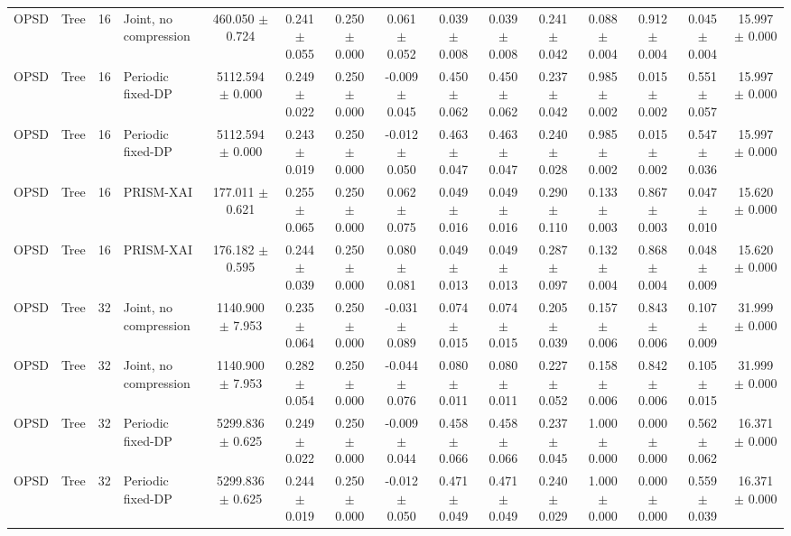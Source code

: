 \begin{table}[t]
\begin{tabular}{llllccccccccccc}
OPSD & Tree & 16 & Joint, no compression & 460.050 $\pm$ 0.724 & 0.241 $\pm$ 0.055 & 0.250 $\pm$ 0.000 & 0.061 $\pm$ 0.052 & 0.039 $\pm$ 0.008 & 0.039 $\pm$ 0.008 & 0.241 $\pm$ 0.042 & 0.088 $\pm$ 0.004 & 0.912 $\pm$ 0.004 & 0.045 $\pm$ 0.004 & 15.997 $\pm$ 0.000 \\
OPSD & Tree & 16 & Periodic fixed-DP & 5112.594 $\pm$ 0.000 & 0.249 $\pm$ 0.022 & 0.250 $\pm$ 0.000 & -0.009 $\pm$ 0.045 & 0.450 $\pm$ 0.062 & 0.450 $\pm$ 0.062 & 0.237 $\pm$ 0.042 & 0.985 $\pm$ 0.002 & 0.015 $\pm$ 0.002 & 0.551 $\pm$ 0.057 & 15.997 $\pm$ 0.000 \\
OPSD & Tree & 16 & Periodic fixed-DP & 5112.594 $\pm$ 0.000 & 0.243 $\pm$ 0.019 & 0.250 $\pm$ 0.000 & -0.012 $\pm$ 0.050 & 0.463 $\pm$ 0.047 & 0.463 $\pm$ 0.047 & 0.240 $\pm$ 0.028 & 0.985 $\pm$ 0.002 & 0.015 $\pm$ 0.002 & 0.547 $\pm$ 0.036 & 15.997 $\pm$ 0.000 \\
OPSD & Tree & 16 & PRISM-XAI & 177.011 $\pm$ 0.621 & 0.255 $\pm$ 0.065 & 0.250 $\pm$ 0.000 & 0.062 $\pm$ 0.075 & 0.049 $\pm$ 0.016 & 0.049 $\pm$ 0.016 & 0.290 $\pm$ 0.110 & 0.133 $\pm$ 0.003 & 0.867 $\pm$ 0.003 & 0.047 $\pm$ 0.010 & 15.620 $\pm$ 0.000 \\
OPSD & Tree & 16 & PRISM-XAI & 176.182 $\pm$ 0.595 & 0.244 $\pm$ 0.039 & 0.250 $\pm$ 0.000 & 0.080 $\pm$ 0.081 & 0.049 $\pm$ 0.013 & 0.049 $\pm$ 0.013 & 0.287 $\pm$ 0.097 & 0.132 $\pm$ 0.004 & 0.868 $\pm$ 0.004 & 0.048 $\pm$ 0.009 & 15.620 $\pm$ 0.000 \\
OPSD & Tree & 32 & Joint, no compression & 1140.900 $\pm$ 7.953 & 0.235 $\pm$ 0.064 & 0.250 $\pm$ 0.000 & -0.031 $\pm$ 0.089 & 0.074 $\pm$ 0.015 & 0.074 $\pm$ 0.015 & 0.205 $\pm$ 0.039 & 0.157 $\pm$ 0.006 & 0.843 $\pm$ 0.006 & 0.107 $\pm$ 0.009 & 31.999 $\pm$ 0.000 \\
OPSD & Tree & 32 & Joint, no compression & 1140.900 $\pm$ 7.953 & 0.282 $\pm$ 0.054 & 0.250 $\pm$ 0.000 & -0.044 $\pm$ 0.076 & 0.080 $\pm$ 0.011 & 0.080 $\pm$ 0.011 & 0.227 $\pm$ 0.052 & 0.158 $\pm$ 0.006 & 0.842 $\pm$ 0.006 & 0.105 $\pm$ 0.015 & 31.999 $\pm$ 0.000 \\
OPSD & Tree & 32 & Periodic fixed-DP & 5299.836 $\pm$ 0.625 & 0.249 $\pm$ 0.022 & 0.250 $\pm$ 0.000 & -0.009 $\pm$ 0.044 & 0.458 $\pm$ 0.066 & 0.458 $\pm$ 0.066 & 0.237 $\pm$ 0.045 & 1.000 $\pm$ 0.000 & 0.000 $\pm$ 0.000 & 0.562 $\pm$ 0.062 & 16.371 $\pm$ 0.000 \\
OPSD & Tree & 32 & Periodic fixed-DP & 5299.836 $\pm$ 0.625 & 0.244 $\pm$ 0.019 & 0.250 $\pm$ 0.000 & -0.012 $\pm$ 0.050 & 0.471 $\pm$ 0.049 & 0.471 $\pm$ 0.049 & 0.240 $\pm$ 0.029 & 1.000 $\pm$ 0.000 & 0.000 $\pm$ 0.000 & 0.559 $\pm$ 0.039 & 16.371 $\pm$ 0.000 \\

\end{tabular}
\end{table}
